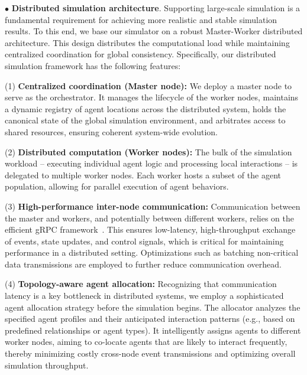 \documentclass{article}
\theoremstyle{definition}
\theoremstyle{theorem}
\theoremstyle{proof}
\theoremstyle{remark}
\begin{document}
    $\bullet$ \textbf{Distributed simulation architecture}.
    Supporting large-scale simulation is a fundamental requirement for achieving more realistic and stable simulation results. To this end, we base our simulator on a robust Master-Worker distributed architecture. This design distributes the computational load while maintaining centralized coordination for global consistency. Specifically, our distributed simulation framework has the following features:
    
    (1) \textbf{Centralized coordination (Master node):} We deploy a master node to serve as the orchestrator. It manages the lifecycle of the worker nodes, maintains a dynamic registry of agent locations across the distributed system, holds the canonical state of the global simulation environment, and arbitrates access to shared resources, ensuring coherent system-wide evolution.
    
    (2) \textbf{Distributed computation (Worker nodes):} The bulk of the simulation workload – executing individual agent logic and processing local interactions – is delegated to multiple worker nodes. Each worker hosts a subset of the agent population, allowing for parallel execution of agent behaviors.
    
    (3) \textbf{High-performance inter-node communication:} Communication between the master and workers, and potentially between different workers, relies on the efficient gRPC framework~\cite{wang1993grpc}. This ensures low-latency, high-throughput exchange of events, state updates, and control signals, which is critical for maintaining performance in a distributed setting. Optimizations such as batching non-critical data transmissions are employed to further reduce communication overhead.
    
    (4) \textbf{Topology-aware agent allocation:} Recognizing that communication latency is a key bottleneck in distributed systems, we employ a sophisticated agent allocation strategy before the simulation begins. The allocator analyzes the specified agent profiles and their anticipated interaction patterns (e.g., based on predefined relationships or agent types). It intelligently assigns agents to different worker nodes, aiming to co-locate agents that are likely to interact frequently, thereby minimizing costly cross-node event transmissions and optimizing overall simulation throughput. 
    
\end{document}
